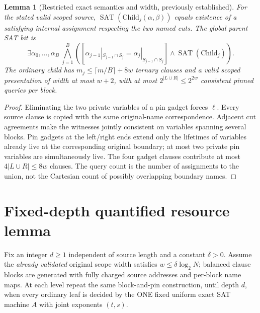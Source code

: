 \documentclass[11pt]{article}
\newtheorem{lemma}[theorem]{Lemma}
\begin{document}
\begin{lemma}[Restricted exact semantics and width, previously established]
For the stated valid scoped source, $\operatorname{SAT}(\mathrm{Child}_j(\alpha,\beta))$ equals existence of a satisfying internal assignment respecting the two named cuts. The global parent SAT bit is
\[
\exists\alpha_0,\ldots,\alpha_B\
\bigwedge_{j=1}^B
\left([\alpha_{j-1}|_{S_{j-1}\cap S_j}
=\alpha_j|_{S_{j-1}\cap S_j}]
\wedge\operatorname{SAT}(\mathrm{Child}_j)\right).
\]
The ordinary child has $m_j\le\lceil m/B\rceil+8w$ ternary clauses and a valid scoped presentation of width at most $w+2$, with at most $2^{|L\cup R|}\le2^{2w}$ consistent pinned queries per block.
\end{lemma}
\begin{proof}
Eliminating the two private variables of a pin gadget forces $\ell$. Every source clause is copied with the same original-name correspondence. Adjacent cut agreements make the witnesses jointly consistent on variables spanning several blocks. Pin gadgets at the left/right ends extend only the lifetimes of variables already live at the corresponding original boundary; at most two private pin variables are simultaneously live. The four gadget clauses contribute at most $4|L\cup R|\le8w$ clauses. The query count is the number of assignments to the union, not the Cartesian count of possibly overlapping boundary names.
\end{proof}

\section{Fixed-depth quantified resource lemma}
Fix an integer $d\ge1$ independent of source length and a constant $\delta>0$. Assume the \emph{already validated} original scope width satisfies
$w\le\delta\log_2 N$; balanced clause blocks are generated with fully charged source addresses and per-block name maps. At each level repeat the same block-and-pin construction, until depth $d$, when every ordinary leaf is decided by the ONE fixed uniform exact SAT machine $A$ with joint exponents $(t,s)$.
\end{document}
